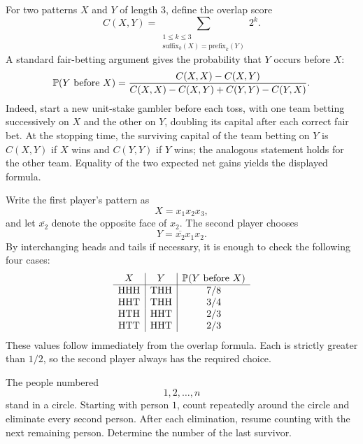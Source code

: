     \begin{solution}
        For two patterns $X$ and $Y$ of length $3$, define the overlap score
        \[
            C(X,Y)
            =
            \sum_{\substack{1\leq k\leq3\\
            \text{suffix}_k(X)=\text{prefix}_k(Y)}}2^k.
        \]
        A standard fair-betting argument gives the probability that $Y$ occurs
        before $X$:
        \[
            \mathbb{P}(Y\text{ before }X)
            =
            \frac{C(X,X)-C(X,Y)}
            {C(X,X)-C(X,Y)+C(Y,Y)-C(Y,X)}.
        \]
        Indeed, start a new unit-stake gambler before each toss, with one team
        betting successively on $X$ and the other on $Y$, doubling its capital
        after each correct fair bet. At the stopping time, the surviving
        capital of the team betting on $Y$ is $C(X,Y)$ if $X$ wins and
        $C(Y,Y)$ if $Y$ wins; the analogous statement holds for the other
        team. Equality of the two expected net gains yields the displayed
        formula.

        Write the first player's pattern as
        \[
            X=x_1x_2x_3,
        \]
        and let $\overline{x_2}$ denote the opposite face of $x_2$. The second
        player chooses
        \[
            Y=\overline{x_2}x_1x_2.
        \]
        By interchanging heads and tails if necessary, it is enough to check
        the following four cases:
        \[
            \begin{array}{c|c|c}
                X & Y & \mathbb{P}(Y\text{ before }X)\\
                \hline
                \mathrm{HHH} & \mathrm{THH} & 7/8\\
                \mathrm{HHT} & \mathrm{THH} & 3/4\\
                \mathrm{HTH} & \mathrm{HHT} & 2/3\\
                \mathrm{HTT} & \mathrm{HHT} & 2/3
            \end{array}
        \]
        These values follow immediately from the overlap formula. Each is
        strictly greater than $1/2$, so the second player always has the
        required choice.
    \end{solution}

    \begin{expectedproblem}
        The people numbered
        \[
            1,2,\ldots,n
        \]
        stand in a circle. Starting with person $1$, count repeatedly around
        the circle and eliminate every second person. After each elimination,
        resume counting with the next remaining person. Determine the number
        of the last survivor.
    \end{expectedproblem}

